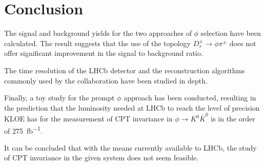 \section{Conclusion}
The signal and background yields for the two approaches of $\phi$ selection have been calculated. The result suggests that the use of the topology $D_s^\pm \rightarrow \phi\pi^\pm$ does not offer significant improvement in the signal to background ratio.

The time resolution of the LHCb detector and the reconstruction algorithms commonly used by the collaboration have been studied in depth.

Finally, a toy study for the prompt $\phi$ approach has been conducted, resulting in the prediction that the luminosity needed at LHCb to reach the level of precision KLOE has for the measurement of CPT invariance in $\phi \rightarrow K^0\overline{K}^0$ is in the order of \SI{275}{fb^{-1}}.

It can be concluded that with the means currently available to LHCb, the study of CPT invariance in the given system does not seem feasible.